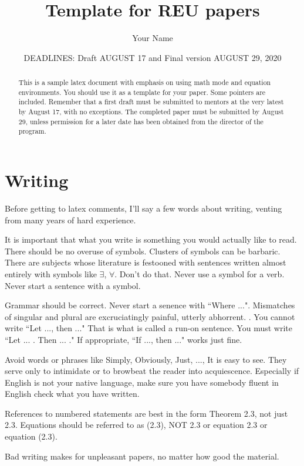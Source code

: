 \documentclass[psamsfonts]{amsart}
\title{Template for REU papers}
\author{Your Name}
\date{DEADLINES: Draft AUGUST 17 and Final version AUGUST 29, 2020}
\theoremstyle{definition}
\theoremstyle{remark}
\numberwithin{equation}{section}
\begin{document}
\begin{abstract}

This is a sample latex document with emphasis on using math mode and
equation environments.  You should use it as a template for your paper.
Some pointers are included. 
Remember that a first draft must be submitted to mentors at the very 
latest by August 17, with
no exceptions.  The completed paper must be submitted by August 29, unless 
permission for a later date has been obtained from the director of the program. 


\end{abstract}

\maketitle

\tableofcontents

\section{Writing}  Before getting to latex comments, I'll say a few words about writing, venting from many years of hard experience. 

It is important that what you write is something you would actually like to read.  There should be no overuse of symbols.
Clusters of symbols can be barbaric.  There are subjects whose literature is festooned with sentences written almost entirely with symbols like $\exists$, $\forall$.  Don't do that. Never use a symbol for a verb.  Never start a sentence with a symbol.  

Grammar should be correct.  Never start a senence with ``Where ...".   
Mismatches of singular and plural are excruciatingly painful, utterly abhorrent. . You cannot write
``Let ..., then ..."  That is what is called a run-on sentence. You must write ``Let ... .  Then ... ."
If appropriate, ``If ..., then ..."  works just fine.

Avoid words or phrases like Simply, Obviously, Just, ..., It is easy to see.  They serve only to intimidate or to browbeat the reader into acquiescence. 
Especially if English is not your native language, make sure you have  somebody fluent in English check what you have written.     

References to numbered statements are best in the form Theorem 2.3, not just 2.3.
Equations should be referred to as (2.3), NOT 2.3 or equation 2.3 or equation (2.3).


Bad writing makes for unpleasant papers, no matter how good the material.
\end{document}
